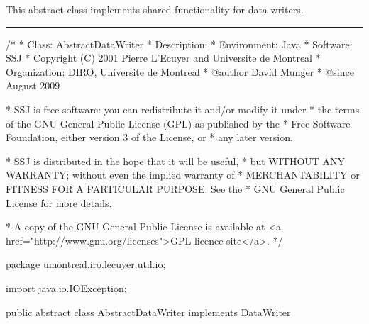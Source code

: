 
This abstract class implements shared functionality for data writers.

\bigskip\hrule

\begin{code}
\begin{hide}
/*
 * Class:        AbstractDataWriter
 * Description:  
 * Environment:  Java
 * Software:     SSJ 
 * Copyright (C) 2001  Pierre L'Ecuyer and Universite de Montreal
 * Organization: DIRO, Universite de Montreal
 * @author       David Munger 
 * @since        August 2009

 * SSJ is free software: you can redistribute it and/or modify it under
 * the terms of the GNU General Public License (GPL) as published by the
 * Free Software Foundation, either version 3 of the License, or
 * any later version.

 * SSJ is distributed in the hope that it will be useful,
 * but WITHOUT ANY WARRANTY; without even the implied warranty of
 * MERCHANTABILITY or FITNESS FOR A PARTICULAR PURPOSE.  See the
 * GNU General Public License for more details.

 * A copy of the GNU General Public License is available at
   <a href="http://www.gnu.org/licenses">GPL licence site</a>.
 */
\end{hide}
package umontreal.iro.lecuyer.util.io;
\begin{hide}
import java.io.IOException;
\end{hide}

public abstract class AbstractDataWriter implements DataWriter \begin{hide} {
\end{hide}
\end{code}

